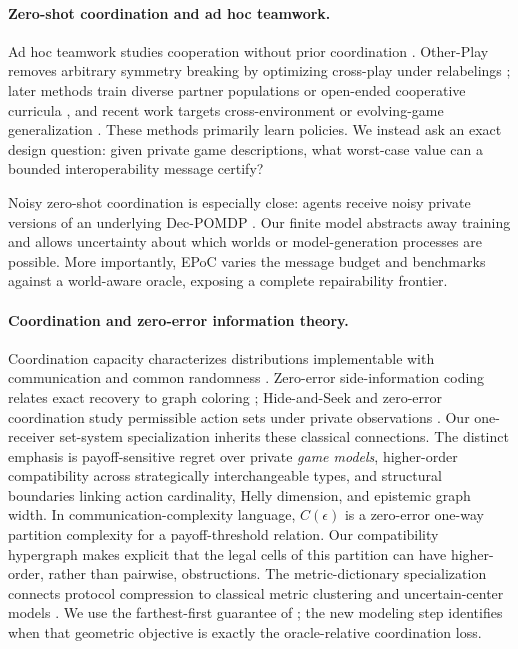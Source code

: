 \documentclass[letterpaper]{article} %
\begin{document}
\paragraph{Zero-shot coordination and ad hoc teamwork.}
Ad hoc teamwork studies cooperation without prior coordination
\citep{stone2010adhoc,tambe1997flexible}. Other-Play removes arbitrary symmetry
breaking by optimizing cross-play under relabelings \citep{hu2020otherplay};
later methods train diverse partner populations or open-ended cooperative
curricula \citep{strouse2021collaborating,li2023cole}, and recent work targets
cross-environment or evolving-game generalization
\citep{jha2025cross,hui2026efficient}. These methods primarily learn policies.
We instead ask an exact design question: given private game descriptions, what
worst-case value can a bounded interoperability message certify?

Noisy zero-shot coordination is especially close: agents receive noisy private
versions of an underlying Dec-POMDP \citep{anwar2024noisy}. Our finite model
abstracts away training and allows uncertainty about which worlds or
model-generation processes are possible. More importantly, EPoC varies the
message budget and benchmarks against a world-aware oracle, exposing a complete
repairability frontier.

\paragraph{Coordination and zero-error information theory.}
Coordination capacity characterizes distributions implementable with
communication and common randomness \citep{cuff2010coordination,cuff2013distributed}.
Zero-error side-information coding relates exact recovery to graph coloring
\citep{witsenhausen1976zero}; Hide-and-Seek and zero-error coordination study
permissible action sets under private observations
\citep{mceliece1971hide,abroshan2015zero}. Our one-receiver set-system
specialization inherits these classical connections. The distinct emphasis is
payoff-sensitive regret over private \emph{game models}, higher-order
compatibility across strategically interchangeable types, and structural
boundaries linking action cardinality, Helly dimension, and epistemic graph
width. In communication-complexity language, $C(\epsilon)$ is a zero-error
one-way partition complexity for a payoff-threshold relation. Our compatibility
hypergraph makes explicit that the legal cells of this partition can have
higher-order, rather than pairwise, obstructions. The metric-dictionary specialization connects protocol compression to
classical metric clustering and uncertain-center models
\citep{gonzalez1985clustering,xu2025uncertain}. We use the farthest-first
guarantee of \citet{gonzalez1985clustering}; the new modeling step identifies
when that geometric objective is exactly the oracle-relative coordination
loss.
\end{document}
